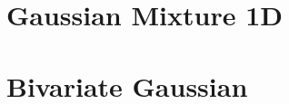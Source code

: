 \documentclass[a4paper]{article}
\theoremstyle{definition}
\DeclareMathOperator{\mise}{MISE}
\DeclareMathOperator{\mse}{MSE}
\DeclareMathOperator{\ent}{Ent}
\begin{document}

\section{Gaussian Mixture 1D}
\section{Bivariate Gaussian}


\end{document}
